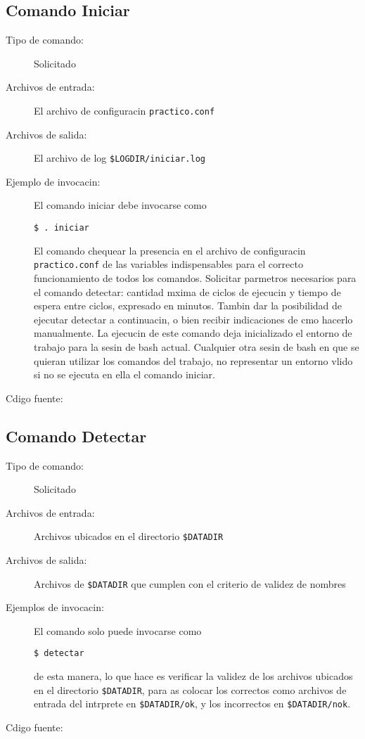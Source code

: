 \documentclass[12pt]{article}
\begin{document}
\subsection{Comando Iniciar}
\begin{description}
	\item [Tipo de comando:] Solicitado
	
	\item [Archivos de entrada:] El archivo de configuracin \verb|practico.conf|
	
	\item [Archivos de salida:] El archivo de log \verb|$LOGDIR/iniciar.log|
	
	\item [Ejemplo de invocacin:] El comando iniciar debe invocarse como
	\begin{verbatim}$ . iniciar\end{verbatim}
	El comando chequear la presencia en el archivo de configuracin \verb|practico.conf| de las variables indispensables para el correcto funcionamiento de todos los comandos. Solicitar parmetros necesarios para el comando detectar: cantidad mxima de ciclos de ejecucin y tiempo de espera entre ciclos, expresado en minutos. Tambin dar la posibilidad de ejecutar detectar a continuacin, o bien recibir indicaciones de cmo hacerlo manualmente. La ejecucin de este comando deja inicializado el entorno de trabajo para la sesin de bash actual. Cualquier otra sesin de bash en que se quieran utilizar los comandos del trabajo, no representar un entorno vlido si no se ejecuta en ella el comando iniciar.
	
	\item [Cdigo fuente:]
\end{description}
{\footnotesize

}

\subsection{Comando Detectar}
\begin{description}
	\item [Tipo de comando:] Solicitado
	
	\item [Archivos de entrada:] Archivos ubicados en el directorio \verb|$DATADIR|
	
	\item [Archivos de salida:] Archivos de \verb|$DATADIR| que cumplen con el criterio de validez de nombres
	
	\item [Ejemplos de invocacin:]	El comando solo puede invocarse como
	\begin{verbatim}$ detectar\end{verbatim}
	de esta manera, lo que hace es verificar la validez de los archivos ubicados en el directorio \verb|$DATADIR|, para as colocar los correctos como archivos de entrada del intrprete en \verb|$DATADIR/ok|, y los incorrectos en \verb|$DATADIR/nok|.
	
	\item [Cdigo fuente:]
\end{description}
{\footnotesize

}
\end{document}
